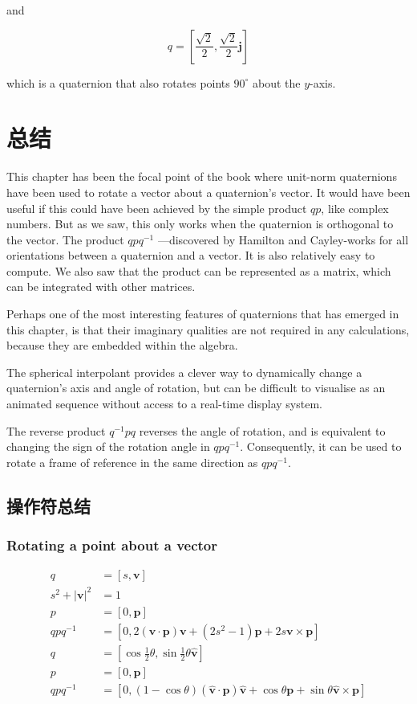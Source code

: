 and

$$
q=\left[\frac{\sqrt{2}}{2}, \frac{\sqrt{2}}{2} \mathbf{j}\right]
$$

which is a quaternion that also rotates points $90^{\circ}$ about the $y$-axis.

\section{总结}
This chapter has been the focal point of the book where unit-norm quaternions have been used to rotate a vector about a quaternion's vector. It would have been useful if this could have been achieved by the simple product $q p$, like complex numbers. But as we saw, this only works when the quaternion is orthogonal to the vector. The product $q p q^{-1}$ —discovered by Hamilton and Cayley-works for all orientations between a quaternion and a vector. It is also relatively easy to compute. We also saw that the product can be represented as a matrix, which can be integrated with other matrices.

Perhaps one of the most interesting features of quaternions that has emerged in this chapter, is that their imaginary qualities are not required in any calculations, because they are embedded within the algebra.

The spherical interpolant provides a clever way to dynamically change a quaternion's axis and angle of rotation, but can be difficult to visualise as an animated sequence without access to a real-time display system.

The reverse product $q^{-1} p q$ reverses the angle of rotation, and is equivalent to changing the sign of the rotation angle in $q p q^{-1}$. Consequently, it can be used to rotate a frame of reference in the same direction as $q p q^{-1}$.

\subsection{操作符总结}
\subsubsection*{Rotating a point about a vector}
$$
\begin{aligned}
q & =[s, \mathbf{v}] \\
s^{2}+|\mathbf{v}|^{2} & =1 \\
p & =[0, \mathbf{p}] \\
q p q^{-1} & =\left[0,2(\mathbf{v} \cdot \mathbf{p}) \mathbf{v}+\left(2 s^{2}-1\right) \mathbf{p}+2 s \mathbf{v} \times \mathbf{p}\right] \\
q & =\left[\cos \frac{1}{2} \theta, \sin \frac{1}{2} \theta \hat{\mathbf{v}}\right] \\
p & =[0, \mathbf{p}] \\
q p q^{-1} & =[0,(1-\cos \theta)(\hat{\mathbf{v}} \cdot \mathbf{p}) \hat{\mathbf{v}}+\cos \theta \mathbf{p}+\sin \theta \hat{\mathbf{v}} \times \mathbf{p}]
\end{aligned}
$$

